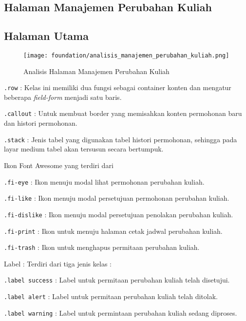 \subsection{Halaman Manajemen Perubahan Kuliah}
\subsection{Halaman Utama}
\begin{figure} [H]
\centering  
\texttt{[image: foundation/analisis\_manajemen\_perubahan\_kuliah.png]}
\caption{Analisis Halaman Manajemen Perubahan Kuliah}
\end{figure}
\begin{description}
	\item \texttt{.row} : Kelas ini memiliki dua fungsi sebagai container konten dan mengatur beberapa \textit{field-form} menjadi satu baris. 
	\item \texttt{.callout} : Untuk membuat border yang memisahkan konten permohonan baru dan histori permohonan.
	\item \texttt{.stack} : Jenis tabel yang digunakan tabel histori permohonan, sehingga pada layar medium tabel akan tersusun secara bertumpuk.
	\item Ikon Font Awesome yang terdiri dari 
	\begin{description}
		\item \texttt{.fi-eye} : Ikon menuju modal lihat permohonan perubahan kuliah.
		\item \texttt{.fi-like} : Ikon menuju modal persetujuan permohonan perubahan kuliah.
		\item \texttt{.fi-dislike} : Ikon menuju modal persetujuan penolakan perubahan kuliah.
		\item \texttt{.fi-print} : Ikon untuk menuju halaman cetak jadwal perubahan kuliah.
		\item \texttt{.fi-trash} : Ikon untuk menghapus permitaan perubahan kuliah.
	\end{description}
	\item Label : Terdiri dari tiga jenis kelas :
	\begin{description}
		\item \texttt{.label success} : Label untuk permitaan perubahan kuliah telah disetujui.
		\item \texttt{.label alert} :  Label untuk permitaan perubahan kuliah telah ditolak.
		\item \texttt{.label warning} : Label untuk permintaan perubahan kuliah sedang diproses.
	\end{description}
	
\end{description}
